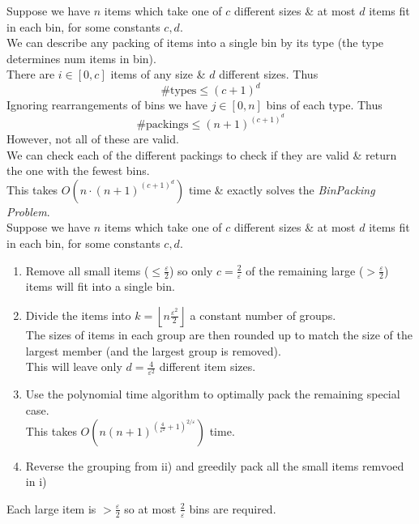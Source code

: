 \documentclass[11pt,a4paper]{article}
\begin{document}
Suppose we have $n$ items which take one of $c$ different sizes \& at most $d$ items fit in each bin, for some constants $c,d$.\\
We can describe any packing of items into a single bin by its type (the type determines num items in bin).\\
There are $i\in[0,c]$ items of any size \& $d$ different sizes. Thus
$$\text{\# types}\leq(c+1)^d$$
Ignoring rearrangements of bins we have $j\in[0,n]$ bins of each type. Thus
$$\text{\# packings}\leq(n+1)^{(c+1)^d}$$
However, not all of these are valid.\\
We can check each of the different packings to check if they are valid \& return the one with the fewest bins.\\
This takes $O(n\cdot(n+1)^{(c+1)^d})$ time \& exactly solves the \textit{BinPacking Problem}.\\

Suppose we have $n$ items which take one of $c$ different sizes \& at most $d$ items fit in each bin, for some constants $c,d$.
\begin{enumerate}
	\item Remove all small items ($\leq\frac\varepsilon2$) so only $c=\frac2\varepsilon$ of the remaining large ($>\frac\varepsilon2$) items will fit into a single bin.
	\item Divide the items into $k=\left\lfloor n\frac{\varepsilon^2}2\right\rfloor$ a constant number of groups.\\
	The sizes of items in each group are then rounded up to match the size of the largest member (and the largest group is removed).\\
	This will leave only $d=\frac4{\varepsilon^2}$ different item sizes.
	\item Use the polynomial time algorithm to optimally pack the remaining special case.\\
	\nb This takes $O\left(n(n+1)^{(\frac4{\varepsilon^2}+1)^{2/\varepsilon}}\right)$ time.
	\item Reverse the grouping from ii) and greedily pack all the small items remvoed in i)
\end{enumerate}

Each large item is $>\frac\varepsilon2$ so at most $\frac2\varepsilon$ bins are required.\\
\end{document}
